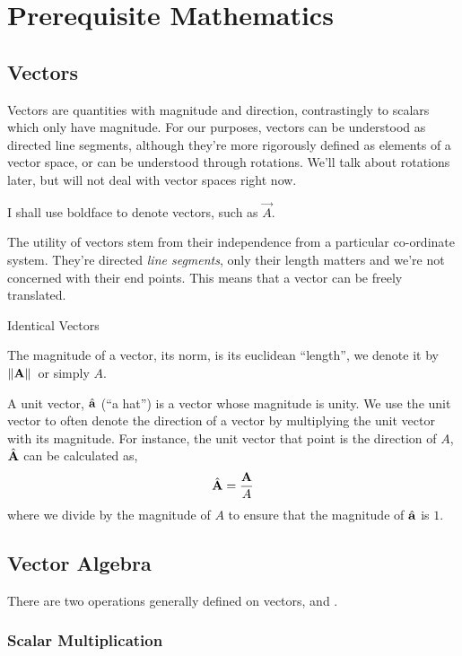 \chapter{Prerequisite Mathematics}

\section{Vectors}

Vectors are quantities with magnitude and direction, contrastingly to scalars which only have magnitude. 
For our purposes, vectors can be understood as directed line segments, although
they're more rigorously defined as elements of a vector space, or can be 
understood through rotations. We'll talk about rotations later, but will not deal with
vector spaces right now.

I shall use boldface to denote vectors, such as \(\vec{A}\). 

The utility of vectors stem from their independence from a particular co-ordinate system. They're
directed \emph{line segments}, only their length
matters and we're not concerned with their end points. This means that a vector 
can be freely translated. 

\begin{marginfigure}
    \caption{Identical Vectors}
\end{marginfigure}

The magnitude of a vector, its norm, is its euclidean ``length'', we denote it
by \(\norm*{\boldsymbol{\mathbf{A}}}\) or simply \(A\). 

A unit vector, \(\hat{\boldsymbol{\mathbf{a}}}\) (``a hat'') is a vector whose magnitude is unity.
We use the unit vector to often denote the direction of a vector by multiplying 
the unit vector with its magnitude. For instance, the unit vector
that point is the direction of \(A\), \(\hat{\boldsymbol{\mathbf{A}}}\) can be calculated as,
\[ \hat{\boldsymbol{\mathbf{A}}} = \frac{\boldsymbol{\mathbf{A}}}{A}\] 
where we divide by the magnitude of \(A\) to ensure that the magnitude of \(\hat{\boldsymbol{\mathbf{a}}}\) is
\(1\).

\section{Vector Algebra}    

There are two operations generally defined on vectors, 
and . 

\subsection{Scalar Multiplication}


